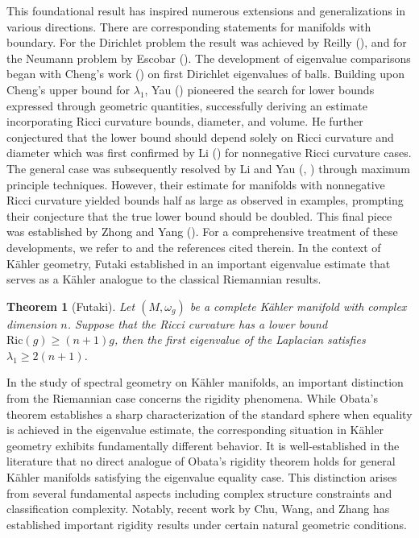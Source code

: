 \documentclass[12pt, reqno]{amsart}
\theoremstyle{plain}
\newtheorem{thm}{Theorem}[section]
\theoremstyle{definition}
\newcommand{\btheorem}{\begin{thm}}
\newcommand{\etheorem}{\end{thm}}
\renewcommand{\>}{\rightarrow}
\renewcommand{\#}{\sharp}
\numberwithin{equation}{section} %
\begin{document}
\noindent This foundational result has inspired numerous extensions
and generalizations in various directions. There are corresponding statements for manifolds with boundary. For 
the Dirichlet problem the result was achieved by Reilly (\cite{Rei77}), and for the 
Neumann problem by Escobar (\cite{Esc88}).  The development of eigenvalue comparisons began with Cheng's work (\cite{Che75}) on first Dirichlet eigenvalues of balls. Building upon Cheng's upper bound for $\lambda_1$, Yau (\cite{Yau75}) pioneered the search for lower bounds expressed through geometric quantities, successfully deriving an estimate incorporating Ricci curvature bounds, diameter, and volume. He further conjectured that the lower bound should depend solely on Ricci curvature and diameter  which was first confirmed by Li (\cite{Li79}) for nonnegative Ricci curvature cases. The general case was subsequently resolved by Li and Yau (\cite{LY80}, \cite{Li82}) through maximum principle techniques. However, their estimate for manifolds with nonnegative Ricci curvature yielded bounds half as large as observed in examples, prompting their conjecture that the true lower bound should be doubled. This final piece was established by Zhong and Yang (\cite{ZY84}). For a comprehensive treatment of these developments, we refer to \cite{LT91} and the references cited therein. In the context of K\"ahler geometry, Futaki  established in
\cite{Fut88} an important eigenvalue estimate that serves as a
K\"ahler analogue to the classical Riemannian results.
\btheorem[Futaki] \label{Futaki}Let $(M,\omega_g)$ be a complete K\"ahler manifold
with complex dimension $n$. Suppose that the Ricci curvature has a
lower bound $\mathrm{Ric}(g)\geq (n+1)g$, then the first eigenvalue
of the Laplacian satisfies $\lambda_1\geq 2(n+1)$. \etheorem


\noindent In the study of spectral geometry on K\"ahler manifolds,
an important distinction from the Riemannian case concerns the
rigidity phenomena. While Obata's theorem establishes a sharp
characterization of the standard sphere when equality is achieved in
the eigenvalue estimate, the corresponding situation in K\"ahler
geometry exhibits fundamentally different behavior.  It is
well-established in the literature that no direct analogue of
Obata's rigidity theorem holds for general K\"ahler manifolds
satisfying the eigenvalue equality case. This distinction arises
from several fundamental aspects including complex structure
constraints and classification complexity. Notably, recent work by Chu, Wang, and Zhang
\cite{CWZ25}  has established important
rigidity results under certain natural geometric conditions.
\end{document}
